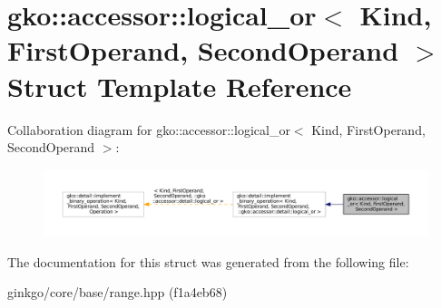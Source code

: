 \hypertarget{structgko_1_1accessor_1_1logical__or}{}\section{gko\+:\+:accessor\+:\+:logical\+\_\+or$<$ Kind, First\+Operand, Second\+Operand $>$ Struct Template Reference}
\label{structgko_1_1accessor_1_1logical__or}


Collaboration diagram for gko\+:\+:accessor\+:\+:logical\+\_\+or$<$ Kind, First\+Operand, Second\+Operand $>$\+:
\nopagebreak
\begin{figure}[H]
\begin{center}
\leavevmode
\includegraphics[width=350pt]{structgko_1_1accessor_1_1logical__or__coll__graph}
\end{center}
\end{figure}


The documentation for this struct was generated from the following file\+:\begin{DoxyCompactItemize}
\item 
ginkgo/core/base/range.\+hpp (f1a4eb68)\end{DoxyCompactItemize}
